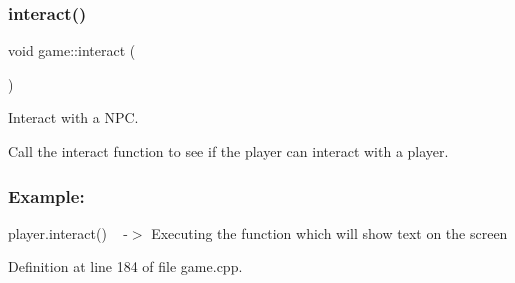 \subsubsection{\texorpdfstring{interact()}{interact()}\hspace{0.1cm}{\footnotesize\ttfamily [1/2]}}
{\footnotesize\ttfamily void game\+::interact (\begin{DoxyParamCaption}{ }\end{DoxyParamCaption})\hspace{0.3cm}{\ttfamily [private]}}



Interact with a N\+PC. 

Call the \textquotesingle{}interact\textquotesingle{} function to see if the player can interact with a player.~\newline


\subsubsection*{Example\+: }

player.\+interact() ~\newline
-\/$>$ Executing the function which will show text on the screen 

Definition at line 184 of file game.\+cpp.

